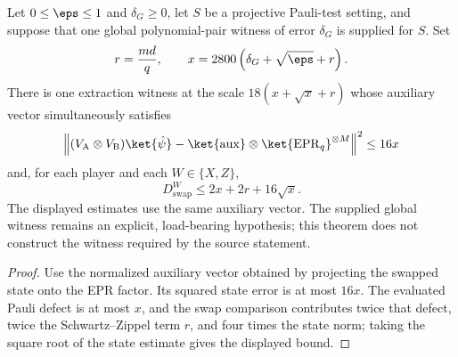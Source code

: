 \begin{theorem}
\label{thm:qld-supplied-extraction-components-explicit}
\leanok
{}
Let $0\leq\eps\leq1$ and $\delta_G\geq0$, let $S$ be a projective
Pauli-test setting, and suppose that one global polynomial-pair witness of
error $\delta_G$ is supplied for $S$.  Set
\[
 r=\frac{md}{q},
 \qquad
 x=2800\left(\delta_G+\sqrt\eps+r\right).
\]
There is one extraction witness at the scale
$18(x+\sqrt{x}+r)$ whose auxiliary vector simultaneously satisfies
\[
 \left\|(V_{\mathrm A}\otimes V_{\mathrm B})\ket{\hat\psi}
   -\ket{\mathrm{aux}}\otimes\ket{\mathrm{EPR}_q}^{\otimes M}\right\|^2
 \leq16x
\]
and, for each player and each $W\in\{X,Z\}$,
\[
 D_{\mathrm{swap}}^W\leq2x+2r+16\sqrt{x}.
\]
The displayed estimates use the same auxiliary vector.  The supplied global
witness remains an explicit, load-bearing hypothesis; this theorem does not
construct the witness required by the source statement.
\end{theorem}
\begin{proof}
Use the normalized auxiliary vector obtained by projecting the swapped state
onto the EPR factor.  Its squared state error is at most $16x$.  The evaluated
Pauli defect is at most $x$, and the swap comparison contributes twice that
defect, twice the Schwartz--Zippel term $r$, and four times the state norm;
taking the square root of the state estimate gives the displayed bound.
\end{proof}

